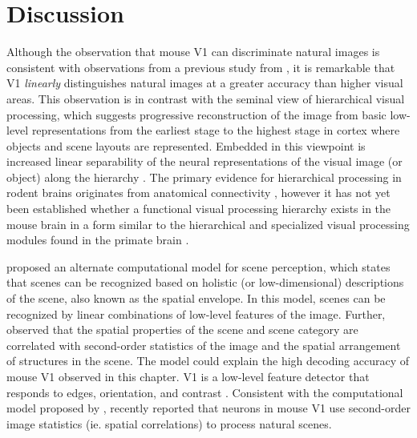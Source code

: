 \section{Discussion}
Although the observation that mouse V1 can discriminate natural images is consistent with observations from a previous study from \textcite{Kampa2011}, it is remarkable that V1 \emph{linearly} distinguishes natural images at a greater accuracy than higher visual areas. This observation is in contrast with the seminal view of hierarchical visual processing, which suggests progressive reconstruction of the image from basic low-level representations from the earliest stage to the highest stage in cortex where objects and scene layouts are represented. Embedded in this viewpoint is increased linear separability of the neural representations of the visual image (or object) along the hierarchy \parencite{Rust2010a,Pagan2013}. The primary evidence for hierarchical processing in rodent brains originates from anatomical connectivity \parencite{Coogan1993,Wang2012,DSouza2016}, however it has not yet been established whether a functional visual processing hierarchy exists in the mouse brain in a form similar to the hierarchical and specialized visual processing modules found in the primate brain \parencite{Felleman1991}. \par 

\textcite{Oliva2001} proposed an alternate computational model for scene perception, which states that scenes can be recognized based on holistic (or low-dimensional) descriptions of the scene, also known as the spatial envelope. In this model, scenes can be recognized by linear combinations of low-level features of the image. Further, \textcite{Torralba2003} observed that the spatial properties of the scene and scene category are correlated with second-order statistics of the image and the spatial arrangement of structures in the scene. The model could explain the high decoding accuracy of mouse V1 observed in this chapter. V1 is a low-level feature detector that responds to edges, orientation, and contrast \parencite{Niell2008a,Glickfeld2013b}. Consistent with the computational model proposed by \textcite{Oliva2001}, \textcite{Rikhye2015} recently reported that neurons in mouse V1 use second-order image statistics (ie. spatial correlations) to process natural scenes. \par 

